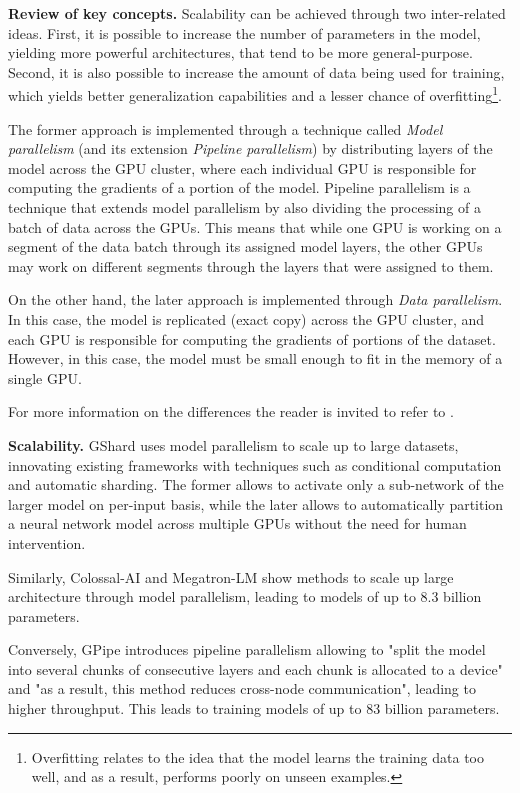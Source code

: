 \textbf{Review of key concepts.}
Scalability can be achieved through two inter-related ideas. First, it is possible to increase the number of parameters in the
model, yielding more powerful architectures, that tend to be more general-purpose. Second, it is also possible to increase the
amount of data being used for training, which yields better generalization capabilities and a lesser chance of
overfitting\footnote{Overfitting relates to the idea that the model learns the training data too well, and as a result,
	performs poorly on unseen examples.}.

The former approach is implemented through a technique called {\em{Model parallelism}} (and its
extension {\em{Pipeline parallelism}}) by distributing layers of the model across the GPU cluster,
where each individual GPU is responsible for computing the gradients of a portion of the model.
Pipeline parallelism is a technique that extends model parallelism by also dividing the processing
of a batch of data across the GPUs. This means that while one GPU is working on a segment of the
data batch through its assigned model layers, the other GPUs may work on different segments through
the layers that were assigned to them.

On the other hand, the later approach is implemented through {\em{Data parallelism}}. In this case,
the model is replicated (exact copy) across the GPU cluster, and each GPU is responsible for
computing the gradients of portions of the dataset. However, in this case, the model must be small
enough to fit in the memory of a single GPU.

For more information on the differences the reader is invited to refer to
\cite{dehghani_distributed_2023}.

\textbf{Scalability.}
GShard \cite{lepikhin_gshard_2020} uses model parallelism to scale up to large
datasets, innovating existing frameworks with techniques such as conditional computation and
automatic sharding. The former allows to activate only a sub-network of the larger model on
per-input basis, while the later allows to automatically partition a neural network model across
multiple GPUs without the need for human intervention.

Similarly, Colossal-AI \cite{li_colossal-ai_2023} and Megatron-LM \cite{shoeybi_megatron-lm_2020}
show methods to scale up large architecture through model parallelism, leading to models of up to
8.3 billion parameters.

Conversely, GPipe \cite{huang_gpipe_2019} introduces pipeline parallelism allowing to "split the
model into several chunks of consecutive layers and each chunk is allocated to a device" and "as a
result, this method reduces cross-node communication", leading to higher throughput. This leads to
training models of up to 83 billion parameters.


